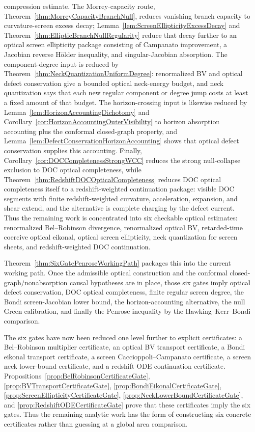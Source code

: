 compression estimate. The Morrey-capacity route, Theorem~\ref{thm:MorreyCapacityBranchNull}, reduces vanishing branch capacity to curvature-screen excess decay; Lemma~\ref{lem:ScreenEllipticityExcessDecay} and Theorem~\ref{thm:EllipticBranchNullRegularity} reduce that decay further to an optical screen ellipticity package consisting of Campanato improvement, a Jacobian reverse H\"older inequality, and singular-Jacobian absorption. The component-degree input is reduced by Theorem~\ref{thm:NeckQuantizationUniformDegree}: renormalized BV and optical defect conservation give a bounded optical neck-energy budget, and neck quantization says that each new regular component or degree jump costs at least a fixed amount of that budget. The horizon-crossing input is likewise reduced by Lemma~\ref{lem:HorizonAccountingDichotomy} and Corollary~\ref{cor:HorizonAccountingOuterVisibility} to horizon absorption accounting plus the conformal closed-graph property, and Lemma~\ref{lem:DefectConservationHorizonAccounting} shows that optical defect conservation supplies this accounting. Finally, Corollary~\ref{cor:DOCCompletenessStrongWCC} reduces the strong null-collapse exclusion to DOC optical completeness, while Theorem~\ref{thm:RedshiftDOCOpticalCompleteness} reduces DOC optical completeness itself to a redshift-weighted continuation package: visible DOC segments with finite redshift-weighted curvature, acceleration, expansion, and shear extend, and the alternative is complete charging by the defect current. Thus the remaining work is concentrated into six checkable optical estimates: renormalized Bel--Robinson divergence, renormalized optical BV, retarded-time coercive optical eikonal, optical screen ellipticity, neck quantization for screen sheets, and redshift-weighted DOC continuation.

Theorem~\ref{thm:SixGatePenroseWorkingPath} packages this into the current working path. Once the admissible optical construction and the conformal closed-graph/nonabsorption causal hypotheses are in place, those six gates imply optical defect conservation, DOC optical completeness, finite regular screen degree, the Bondi screen-Jacobian lower bound, the horizon-accounting alternative, the null Green calibration, and finally the Penrose inequality by the Hawking--Kerr--Bondi comparison.

The six gates have now been reduced one level further to explicit certificates: a Bel--Robinson multiplier certificate, an optical BV transport certificate, a Bondi eikonal transport certificate, a screen Caccioppoli--Campanato certificate, a screen neck lower-bound certificate, and a redshift ODE continuation certificate. Propositions~\ref{prop:BelRobinsonCertificateGate}, \ref{prop:BVTransportCertificateGate}, \ref{prop:BondiEikonalCertificateGate}, \ref{prop:ScreenEllipticityCertificateGate}, \ref{prop:NeckLowerBoundCertificateGate}, and \ref{prop:RedshiftODECertificateGate} prove that these certificates imply the six gates. Thus the remaining analytic work has the form of constructing six concrete certificates rather than guessing at a global area comparison.

